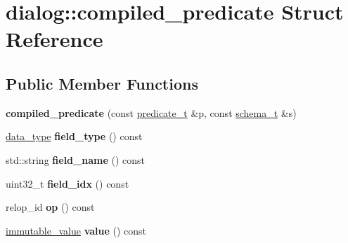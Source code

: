 \hypertarget{structdialog_1_1compiled__predicate}{}\section{dialog\+:\+:compiled\+\_\+predicate Struct Reference}
\label{structdialog_1_1compiled__predicate}
\subsection*{Public Member Functions}
\begin{DoxyCompactItemize}
\item 
\mbox{\label{structdialog_1_1compiled__predicate_a44485c03ea9069ef8d3c7a4950d56ab3}} 
{\bfseries compiled\+\_\+predicate} (const \hyperlink{structdialog_1_1predicate__t}{predicate\+\_\+t} \&p, const \hyperlink{classdialog_1_1schema__t}{schema\+\_\+t} \&s)
\item 
\mbox{\label{structdialog_1_1compiled__predicate_ab73cd9324b4e327ab240b8c18e2e3610}} 
\hyperlink{structdialog_1_1data__type}{data\+\_\+type} {\bfseries field\+\_\+type} () const
\item 
\mbox{\label{structdialog_1_1compiled__predicate_a31867e1b851961ed8ae901896ab3b1ef}} 
std\+::string {\bfseries field\+\_\+name} () const
\item 
\mbox{\label{structdialog_1_1compiled__predicate_a98b98e5a033986b1505d822c80abbb3c}} 
uint32\+\_\+t {\bfseries field\+\_\+idx} () const
\item 
\mbox{\label{structdialog_1_1compiled__predicate_a32d6d0fa858a95d31364b0423c80a92f}} 
relop\+\_\+id {\bfseries op} () const
\item 
\mbox{\label{structdialog_1_1compiled__predicate_af5168fc9bb40ec7ddf7f1ab4e5127269}} 
\hyperlink{classdialog_1_1immutable__value}{immutable\+\_\+value} {\bfseries value} () const
\item 
\mbox{\label{structdialog_1_1compiled__predicate_a8fe898956dcfdc8a1160958bbe1a7a37}} 

\end{DoxyCompactItemize}
